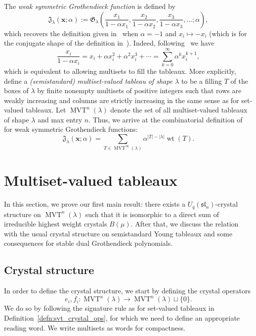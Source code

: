 \documentclass[10pt]{amsart}
\theoremstyle{definition}
\providecommand{\G}{\mathfrak G}
\renewcommand{\G}{\mathfrak{G}}  %
\newcommand{\wG}{\mathfrak{J}}  %
\newcommand{\xx}{\mathbf{x}}
\newcommand{\abs}[1]{\lvert #1 \rvert}
\newcommand{\fsl}{\mathfrak{sl}}
\DeclareMathOperator{\wt}{wt} %
\DeclareMathOperator{\mvt}{MVT} %
\newcommand{\defn}[1]{{\color{darkred}\emph{#1}}} %
\begin{document}
The \defn{weak symmetric Grothendieck function} is defined by
\begin{equation}
\label{eq:weak_definition}
\wG_{\lambda}(\xx; \alpha) := \G_{\lambda}\left( \frac{x_1}{1-\alpha x_1}, \frac{x_2}{1-\alpha x_2}, \frac{x_3}{1-\alpha x_3}, \ldots; \alpha \right),
\end{equation}
which recovers the definition given in~\cite[Thm.~6.11]{PP16} when $\alpha = -1$ and $x_i \mapsto -x_i$ (which is for the conjugate shape of the definition in~\cite{LamPyl07}).
Indeed, following~\cite{PP16} we have
\[
\frac{x_i}{1 - \alpha x_i} = x_i + \alpha x_i^2 + \alpha^2 x_i^3 + \cdots = \sum_{k=0}^{\infty} \alpha^k x_i^{k+1},
\]
which is equivalent to allowing multisets to fill the tableaux.
More explicitly, define a \defn{(semistandard) multiset-valued tableau of shape $\lambda$} to be a filling $T$ of the boxes of $\lambda$ by finite nonempty multisets of positive integers such that rows are weakly increasing and columns are strictly increasing in the same sense as for set-valued tableaux.
Let $\mvt^n(\lambda)$ denote the set of all multiset-valued tableaux of shape $\lambda$ and max entry $n$.
Thus, we arrive at the combinatorial definition of~\cite{LamPyl07} for weak symmetric Grothendieck functions:
\[
\wG_{\lambda}(\xx; \alpha) = \sum_{T \in \mvt^{\infty}(\lambda)} \alpha^{\abs{T}-\abs{\lambda}} \wt(T).
\]
\section{Multiset-valued tableaux}
\label{sec:crystal_MVT}

In this section, we prove our first main result: there exists a $U_q(\fsl_n)$-crystal structure on $\mvt^n(\lambda)$ such that it is isomorphic to a direct sum of irreducible highest weight crystals $B(\mu)$.
After that, we discuss the relation with the usual crystal structure on semistandard Young tableaux and some consequences for stable dual Grothendieck polynomials.


\subsection{Crystal structure}

In order to define the crystal structure, we start by defining the crystal operators 
\[
e_i, f_i \colon \mvt^n(\lambda) \to \mvt^n(\lambda) \sqcup \{0\}.
\]
We do so by following the signature rule as for set-valued tableaux in Definition~\ref{defn:svt_crystal_ops}, for which we need to define an appropriate reading word.
We write multisets as words for compactness.
\end{document}
